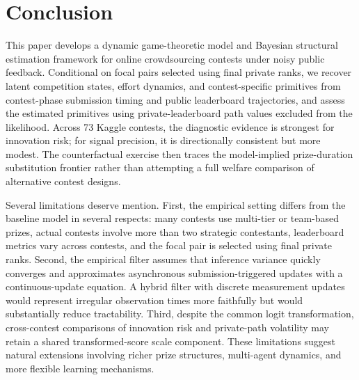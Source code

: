 \documentclass[mnsc]{informs3}
\begin{document}
\section{Conclusion}

This paper develops a dynamic game-theoretic model and Bayesian structural estimation framework for online crowdsourcing contests under noisy public feedback. Conditional on focal pairs selected using final private ranks, we recover latent competition states, effort dynamics, and contest-specific primitives from contest-phase submission timing and public leaderboard trajectories, and assess the estimated primitives using private-leaderboard path values excluded from the likelihood. Across 73 Kaggle contests, the diagnostic evidence is strongest for innovation risk; for signal precision, it is directionally consistent but more modest. The counterfactual exercise then traces the model-implied prize-duration substitution frontier rather than attempting a full welfare comparison of alternative contest designs.


Several limitations deserve mention. First, the empirical setting differs from the baseline model in several respects: many contests use multi-tier or team-based prizes, actual contests involve more than two strategic contestants, leaderboard metrics vary across contests, and the focal pair is selected using final private ranks. Second, the empirical filter assumes that inference variance quickly converges and approximates asynchronous submission-triggered updates with a continuous-update equation. A hybrid filter with discrete measurement updates would represent irregular observation times more faithfully but would substantially reduce tractability. Third, despite the common logit transformation, cross-contest comparisons of innovation risk and private-path volatility may retain a shared transformed-score scale component. These limitations suggest natural extensions involving richer prize structures, multi-agent dynamics, and more flexible learning mechanisms.




%
%
%
\end{document}
